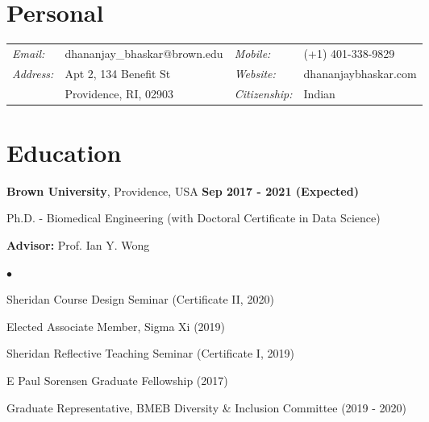 \documentclass[margin,line]{res}
\newenvironment{list1}{
  \begin{list}{\ding{113}}{
      \setlength{\itemsep}{0in}
      \setlength{\parsep}{0in} \setlength{\parskip}{0in}
      \setlength{\topsep}{0in} \setlength{\partopsep}{0in}
      \setlength{\leftmargin}{0.17in}}}{\end{list}}
\newenvironment{list2}{
  \begin{list}{$\bullet$}{
      \setlength{\itemsep}{0in}
      \setlength{\parsep}{0in} \setlength{\parskip}{0in}
      \setlength{\topsep}{0in} \setlength{\partopsep}{0in}
      \setlength{\leftmargin}{0.2in}}}{\end{list}}
\newenvironment{list3}{
  \begin{list}{\textopenbullet}{
      \setlength{\itemsep}{0in}
      \setlength{\parsep}{0in} \setlength{\parskip}{0in}
      \setlength{\topsep}{0in} \setlength{\partopsep}{0in}
      \setlength{\leftmargin}{0.1in}}}{\end{list}}
\begin{document}
\pagestyle{plain}


\begin{resume}

\vspace*{.2cm}

\section{\sc Personal}

\renewcommand{\arraystretch}{1.1}
\begin{tabular}{@{}p{1.4cm}p{6.7cm}p{2.1cm}p{4cm}}
{\it Email:}& dhananjay\_bhaskar@brown.edu &  {\it Mobile:}& (+1) 401-338-9829  \\
{\it Address:}& Apt 2, 134 Benefit St & {\it Website:}& dhananjaybhaskar.com \\
& Providence, RI, 02903 & {\it Citizenship:}& Indian\\
\end{tabular}

\vspace*{.2cm}

\section{\sc Education}

{\bf Brown University}, Providence, USA  \hfill {\bf Sep 2017 - 2021 (Expected)}\\
\vspace*{-.2cm}
\begin{list1}
\item[] Ph.D. - Biomedical Engineering (with Doctoral Certificate in Data Science)
\vspace*{.1cm}
\item[] {\bf Advisor:} Prof. Ian Y. Wong
\begin{list2}
\vspace*{.1cm}
\setlength\itemsep{0.25em}
\item Sheridan Course Design Seminar (Certificate II, 2020)
\item Elected Associate Member, Sigma Xi (2019)
\item Sheridan Reflective Teaching Seminar (Certificate I, 2019)
\item E Paul Sorensen Graduate Fellowship (2017)
\begin{list3}
\vspace*{.1cm}
\item Graduate Representative, BMEB Diversity \& Inclusion Committee (2019 - 2020)
\end{list3}
\end{list2}
\end{list1}
\vspace*{.2cm}


\end{resume}
\end{document}
